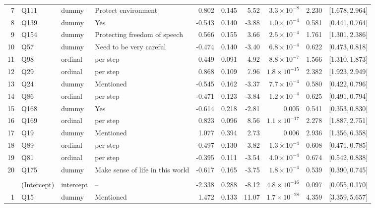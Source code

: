 \begin{landscape}
\begin{longtable}{r l l l r r r r r c}
7 & Q111 & dummy & Protect environment & 0.802 & 0.145 & 5.52 & $3.3{\times}10^{-8}$ & 2.230 & [1.678,\,2.964] &  \\
8 & Q139 & dummy & Yes & -0.543 & 0.140 & -3.88 & $1.0{\times}10^{-4}$ & 0.581 & [0.441,\,0.764] &  \\
9 & Q154 & dummy & Protecting freedom of speech & 0.566 & 0.155 & 3.66 & $2.5{\times}10^{-4}$ & 1.761 & [1.301,\,2.386] &  \\
10 & Q57 & dummy & Need to be very careful & -0.474 & 0.140 & -3.40 & $6.8{\times}10^{-4}$ & 0.622 & [0.473,\,0.818] &  \\
11 & Q98 & ordinal & per step & 0.449 & 0.091 & 4.92 & $8.8{\times}10^{-7}$ & 1.566 & [1.310,\,1.873] &  \\
12 & Q29 & ordinal & per step & 0.868 & 0.109 & 7.96 & $1.8{\times}10^{-15}$ & 2.382 & [1.923,\,2.949] &  \\
13 & Q24 & dummy & Mentioned & -0.545 & 0.162 & -3.37 & $7.7{\times}10^{-4}$ & 0.580 & [0.422,\,0.796] &  \\
14 & Q86 & ordinal & per step & -0.471 & 0.123 & -3.84 & $1.2{\times}10^{-4}$ & 0.625 & [0.491,\,0.794] &  \\
15 & Q168 & dummy & Yes & -0.614 & 0.218 & -2.81 & 0.005 & 0.541 & [0.353,\,0.830] &  \\
16 & Q169 & ordinal & per step & 0.823 & 0.096 & 8.56 & $1.1{\times}10^{-17}$ & 2.278 & [1.887,\,2.751] &  \\
17 & Q19 & dummy & Mentioned & 1.077 & 0.394 & 2.73 & 0.006 & 2.936 & [1.356,\,6.358] &  \\
18 & Q89 & ordinal & per step & -0.497 & 0.130 & -3.82 & $1.3{\times}10^{-4}$ & 0.608 & [0.471,\,0.785] &  \\
19 & Q81 & ordinal & per step & -0.395 & 0.111 & -3.54 & $4.0{\times}10^{-4}$ & 0.674 & [0.542,\,0.838] &  \\
20 & Q175 & dummy & Make sense of life in this world & -0.617 & 0.165 & -3.75 & $1.8{\times}10^{-4}$ & 0.539 & [0.390,\,0.745] &  \\
\addlinespace[4pt]
\multicolumn{9}{l}{\textbf{Cluster 3} \quad \small $n = 2579$ ($n_{\text{in}} = 918$), AIC $= 1909.8$, residual deviance $= 1867.8$ on 2558 df}\\[2pt]
 & (Intercept) & intercept & -- & -2.338 & 0.288 & -8.12 & $4.8{\times}10^{-16}$ & 0.097 & [0.055,\,0.170] &  \\
1 & Q15 & dummy & Mentioned & 1.472 & 0.133 & 11.07 & $1.7{\times}10^{-28}$ & 4.359 & [3.359,\,5.657] &  \\

\end{longtable}
\end{landscape}
